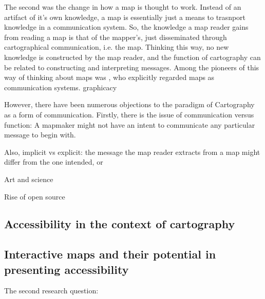 \documentclass[12pt]{article}
\begin{document}
The second was the change in how a map is thought to work.
Instead of an artifact of it's own knowledge,
a map is essentially just a means to trasnport knowledge in a communication system.
So, the knowledge a map reader gains from reading a map is that of the mapper's,
just disseminated through cartographical communication, i.e. the map.
Thinking this way, no new knowledge is constructed by the map reader,  %
and the function of cartography can be related to constructing and interpreting messages.
Among the pioneers of this way of thinking about maps was \textcite{kol1969},
who explicitly regarded maps as communication systems.
\textcite{bal1966} graphicacy

However, there have been numerous objections to the paradigm of Cartography as a form of communication.
Firstly, there is the issue of communication versus function:
A mapmaker might not have an intent to communicate any particular message to begin with.

Also, implicit vs explicit:
the message the map reader extracts from a map might differ from the one intended, or


Art and science \parencite{mac2004, tyn1992}  %


Rise of open source \textcite{pet2015}


\textcite{rot2013a, rot2013b}


\subsection{Accessibility in the context of cartography}




\subsection{Interactive maps and their potential in presenting accessibility}
The second research question:
\end{document}
